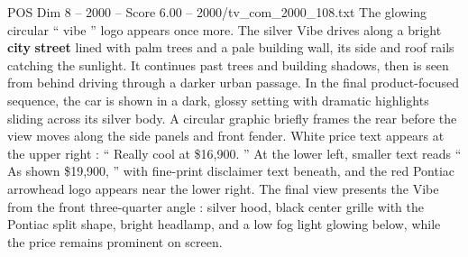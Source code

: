 \begin{textsample}{POS Dim 8 – 2000 – Score 6.00 – 2000/tv\_com\_2000\_108.txt}
The glowing circular “ vibe ” logo appears once more.
The silver Vibe drives along a bright \textbf{city} \textbf{street} lined with palm trees and a pale building wall, its side and roof rails catching the sunlight.
It continues past trees and building shadows, then is seen from behind driving through a darker urban passage.
In the final product-focused sequence, the car is shown in a dark, glossy setting with dramatic highlights sliding across its silver body.
A circular graphic briefly frames the rear before the view moves along the side panels and front fender.
White price text appears at the upper right : “ Really cool at \$16,900. ” At the lower left, smaller text reads “ As shown \$19,900, ” with fine-print disclaimer text beneath, and the red Pontiac arrowhead logo appears near the lower right.
The final view presents the Vibe from the front three-quarter angle : silver hood, black center grille with the Pontiac split shape, bright headlamp, and a low fog light glowing below, while the price remains prominent on screen.

\end{textsample}
